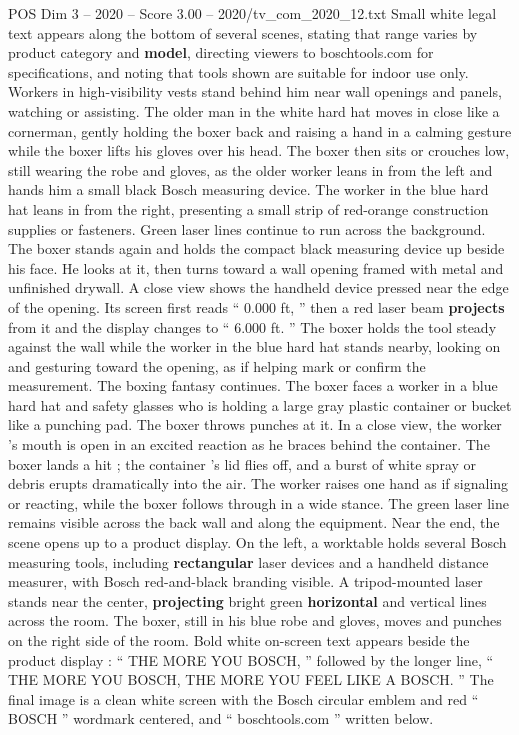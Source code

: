 \begin{textsample}{POS Dim 3 – 2020 – Score 3.00 – 2020/tv\_com\_2020\_12.txt}
Small white legal text appears along the bottom of several scenes, stating that range varies by product category and \textbf{model}, directing viewers to boschtools.com for specifications, and noting that tools shown are suitable for indoor use only.
Workers in high-visibility vests stand behind him near wall openings and panels, watching or assisting.
The older man in the white hard hat moves in close like a cornerman, gently holding the boxer back and raising a hand in a calming gesture while the boxer lifts his gloves over his head.
The boxer then sits or crouches low, still wearing the robe and gloves, as the older worker leans in from the left and hands him a small black Bosch measuring device.
The worker in the blue hard hat leans in from the right, presenting a small strip of red-orange construction supplies or fasteners.
Green laser lines continue to run across the background.
The boxer stands again and holds the compact black measuring device up beside his face.
He looks at it, then turns toward a wall opening framed with metal and unfinished drywall.
A close view shows the handheld device pressed near the edge of the opening.
Its screen first reads “ 0.000 ft, ” then a red laser beam \textbf{projects} from it and the display changes to “ 6.000 ft. ” The boxer holds the tool steady against the wall while the worker in the blue hard hat stands nearby, looking on and gesturing toward the opening, as if helping mark or confirm the measurement.
The boxing fantasy continues.
The boxer faces a worker in a blue hard hat and safety glasses who is holding a large gray plastic container or bucket like a punching pad.
The boxer throws punches at it.
In a close view, the worker ’s mouth is open in an excited reaction as he braces behind the container.
The boxer lands a hit ; the container ’s lid flies off, and a burst of white spray or debris erupts dramatically into the air.
The worker raises one hand as if signaling or reacting, while the boxer follows through in a wide stance.
The green laser line remains visible across the back wall and along the equipment.
Near the end, the scene opens up to a product display.
On the left, a worktable holds several Bosch measuring tools, including \textbf{rectangular} laser devices and a handheld distance measurer, with Bosch red-and-black branding visible.
A tripod-mounted laser stands near the center, \textbf{projecting} bright green \textbf{horizontal} and vertical lines across the room.
The boxer, still in his blue robe and gloves, moves and punches on the right side of the room.
Bold white on-screen text appears beside the product display : “ THE MORE YOU BOSCH, ” followed by the longer line, “ THE MORE YOU BOSCH, THE MORE YOU FEEL LIKE A BOSCH. ” The final image is a clean white screen with the Bosch circular emblem and red “ BOSCH ” wordmark centered, and “ boschtools.com ” written below.

\end{textsample}
